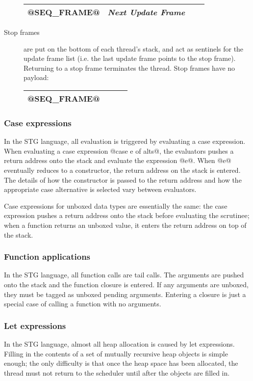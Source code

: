 \documentclass[11pt]{article}
\newcommand{\Subsubsection}[2]{\subsubsection{#1}\label{sec:#2}}
\begin{document}
\begin{description}
\begin{center}
\begin{tabular}{|l|l|l|l|}\hline
@SEQ_FRAME@ & \emph{Next Update Frame} \\ \hline
\end{tabular}
\end{center}

\item[Stop frames] are put on the bottom of each thread's stack, and
act as sentinels for the update frame list (i.e. the last update frame
points to the stop frame).  Returning to a stop frame terminates the
thread.  Stop frames have no payload:

\begin{center}
\begin{tabular}{|l|l|l|l|}\hline
@SEQ_FRAME@ \\ \hline
\end{tabular}
\end{center}

\end{description}

\Subsubsection{Case expressions}{case-expr-overview}

In the STG language, all evaluation is triggered by evaluating a case
expression.  When evaluating a case expression @case e of alts@, the
evaluators pushes a return address onto the stack and evaluate the
expression @e@.  When @e@ eventually reduces to a constructor, the
return address on the stack is entered.  The details of how the
constructor is passed to the return address and how the appropriate
case alternative is selected vary between evaluators.

Case expressions for unboxed data types are essentially the same: the
case expression pushes a return address onto the stack before
evaluating the scrutinee; when a function returns an unboxed value, it
enters the return address on top of the stack.


\Subsubsection{Function applications}{fun-app-overview}

In the STG language, all function calls are tail calls.  The arguments
are pushed onto the stack and the function closure is entered.  If any
arguments are unboxed, they must be tagged as unboxed pending
arguments.  Entering a closure is just a special case of calling a
function with no arguments.


\Subsubsection{Let expressions}{let-expr-overview}

In the STG language, almost all heap allocation is caused by let
expressions.  Filling in the contents of a set of mutually recursive
heap objects is simple enough; the only difficulty is that once the
heap space has been allocated, the thread must not return to the
scheduler until after the objects are filled in.
\end{document}
